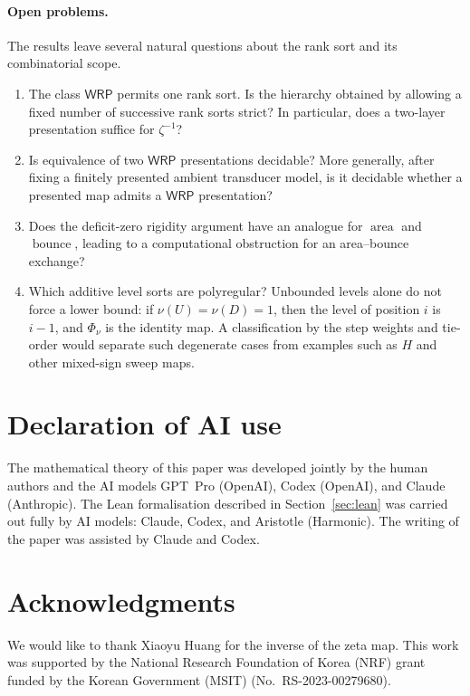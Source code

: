 \documentclass[11pt]{article}
\theoremstyle{definition}
\newcommand{\WRP}{\mathsf{WRP}}
\newcommand{\area}{\operatorname{area}}
\newcommand{\bounce}{\operatorname{bounce}}
\begin{document}
\paragraph{Open problems.}
The results leave several natural questions about the rank sort and its
combinatorial scope.
\begin{enumerate}[label=(\arabic*)]
\item The class $\WRP$ permits one rank sort.  Is the hierarchy obtained by
allowing a fixed number of successive rank sorts strict?  In particular, does
a two-layer presentation suffice for $\zeta^{-1}$?
\item Is equivalence of two $\WRP$ presentations decidable?  More generally,
after fixing a finitely presented ambient transducer model, is it decidable
whether a presented map admits a $\WRP$ presentation?
\item Does the deficit-zero rigidity argument have an analogue for $\area$
and $\bounce$, leading to a computational obstruction for an area--bounce
exchange?
\item Which additive level sorts are polyregular?  Unbounded levels alone do
not force a lower bound: if $\nu(U)=\nu(D)=1$, then the level of position $i$
is $i-1$, and $\Phi_\nu$ is the identity map.  A classification by the step
weights and tie-order would separate such degenerate cases from examples such
as $H$ and other mixed-sign sweep maps.
\end{enumerate}

\section*{Declaration of AI use}
The mathematical theory of this paper was developed jointly by the human
authors and the AI models GPT~Pro (OpenAI), Codex (OpenAI), and Claude
(Anthropic).  The Lean formalisation described in Section~\ref{sec:lean} was
carried out fully by AI models: Claude, Codex, and Aristotle (Harmonic).  The
writing of the paper was assisted by Claude and Codex.

\section*{Acknowledgments}
We would like to thank Xiaoyu Huang for the inverse of the zeta map.
This work was supported by the National Research Foundation of Korea (NRF)
grant funded by the Korean Government (MSIT) (No.~RS-2023-00279680).



\end{document}

